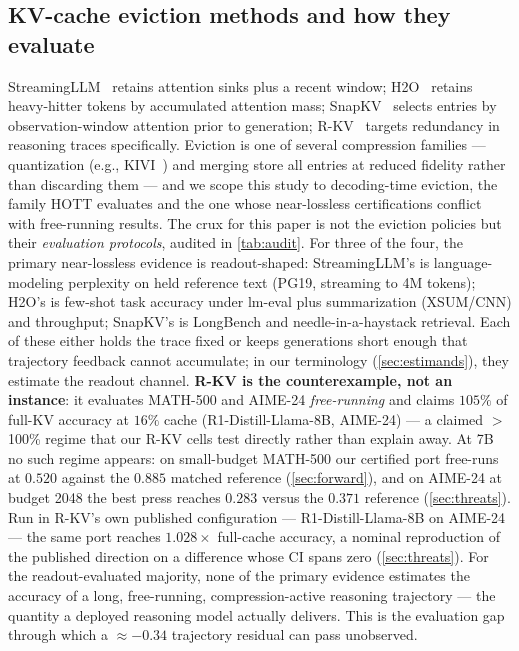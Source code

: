 \documentclass{article}
\begin{document}
\subsection{KV-cache eviction methods and how they evaluate}
StreamingLLM~\citep{xiao2023streamingllm} retains attention sinks plus a recent window; H2O~\citep{zhang2023h2o} retains heavy-hitter tokens by accumulated attention mass; SnapKV~\citep{li2024snapkv} selects entries by observation-window attention prior to generation; R-KV~\citep{rkv2025} targets redundancy in reasoning traces specifically. Eviction is one of several compression families --- quantization (e.g., KIVI~\citep{liu2024kivi}) and merging store all entries at reduced fidelity rather than discarding them --- and we scope this study to decoding-time eviction, the family HOTT evaluates and the one whose near-lossless certifications conflict with free-running results. The crux for this paper is not the eviction policies but their \emph{evaluation protocols}, audited in \cref{tab:audit}. For three of the four, the primary near-lossless evidence is readout-shaped: StreamingLLM's is language-modeling perplexity on held reference text (PG19, streaming to 4M tokens); H2O's is few-shot task accuracy under lm-eval plus summarization (XSUM/CNN) and throughput; SnapKV's is LongBench and needle-in-a-haystack retrieval. Each of these either holds the trace fixed or keeps generations short enough that trajectory feedback cannot accumulate; in our terminology (\cref{sec:estimands}), they estimate the readout channel. \textbf{R-KV is the counterexample, not an instance}: it evaluates MATH-500 and AIME-24 \emph{free-running} and claims $105\%$ of full-KV accuracy at $16\%$ cache (R1-Distill-Llama-8B, AIME-24) --- a claimed $>$100\% regime that our R-KV cells test directly rather than explain away. At 7B no such regime appears: on small-budget MATH-500 our certified port free-runs at $0.520$ against the $0.885$ matched reference (\cref{sec:forward}), and on AIME-24 at budget 2048 the best press reaches $0.283$ versus the $0.371$ reference (\cref{sec:threats}). Run in R-KV's own published configuration --- R1-Distill-Llama-8B on AIME-24 --- the same port reaches $1.028\times$ full-cache accuracy, a nominal reproduction of the published direction on a difference whose CI spans zero (\cref{sec:threats}). For the readout-evaluated majority, none of the primary evidence estimates the accuracy of a long, free-running, compression-active reasoning trajectory --- the quantity a deployed reasoning model actually delivers. This is the evaluation gap through which a $\approx -0.34$ trajectory residual can pass unobserved.
\end{document}

